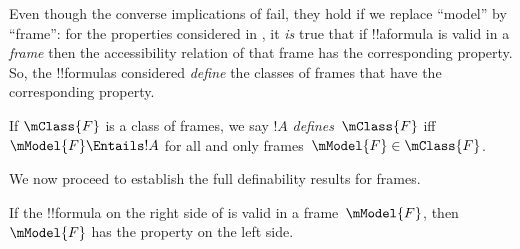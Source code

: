 \documentclass[../../../include/open-logic-section]{subfiles}
\begin{document}


Even though the converse implications of 
fail, they hold if we replace ``model'' by ``frame'': for the
properties considered in , it \emph{is}
true that if !!a{formula} is valid in a \emph{frame} then the
accessibility relation of that frame has the corresponding
property. So, the !!{formula}s considered \emph{define} the classes of
frames that have the corresponding property.

\begin{defn}
  If $\mClass{F}$ is a class of frames, we say $!A$
  \emph{defines}~$\mClass{F}$ iff $\mModel{F} \Entails !A$ for all and only
  frames~$\mModel{F} \in \mClass{F}$.
\end{defn}

We now proceed to establish the full definability results for
frames.

\begin{thm}
If the !!{formula} on the right side of  is valid in a
frame~$\mModel{F}$, then $\mModel{F}$ has the property on the left
side.
\end{thm}
\end{document}
